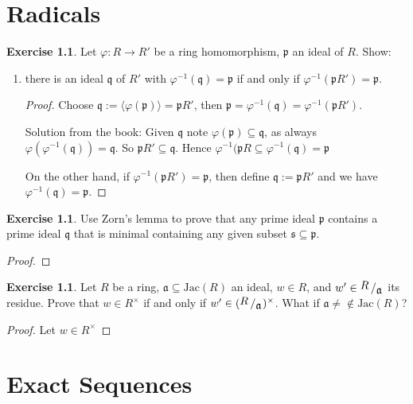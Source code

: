 \documentclass{book}
\theoremstyle{plain}
\theoremstyle{definition}
\newtheorem{exr}[thm]{Exercise}
\theoremstyle{custom_definition}
\newcommand{\bigslant}[2]{{\raisebox{.2em}{$#1$}\left/\raisebox{-.2em}{$#2$}\right.}}
\begin{document}
\chapter{Radicals}

\begin{exr}%
  Let \(\varphi: R \longrightarrow R'\) be a ring homomorphism, \(\mathfrak{p}\) an ideal of \(R\). Show:
  \begin{enumerate}
    \item there is an ideal \(\mathfrak{q}\) of \(R'\) with \(\varphi^{-1}(\mathfrak{q}) = \mathfrak{p}\) if and only if \(\varphi^{-1}(\mathfrak{p}R') = \mathfrak{p}\).
    \begin{proof}
      Choose \(\mathfrak{q} := \langle \varphi(\mathfrak{p}) \rangle = \mathfrak{p}R'\), then \(\mathfrak{p} = \varphi^{-1}(\mathfrak{q}) = \varphi^{-1}(\mathfrak{p}R')\).

      Solution from the book: Given \(\mathfrak{q}\) note \(\varphi(\mathfrak{p}) \subseteq \mathfrak{q}\), as always \(\varphi(\varphi^{-1} (\mathfrak{q})) = \mathfrak{q}\). So \(\mathfrak{p}R' \subseteq \mathfrak{q}\). Hence \(\varphi^{-1}(\mathfrak{p}R \subseteq \varphi^{-1}(\mathfrak{q}) = \mathfrak{p}\)

      On the other hand, if \(\varphi^{-1}(\mathfrak{p}R') = \mathfrak{p}\), then define \(\mathfrak{q} := \mathfrak{p}R'\) and we have \(\varphi^{-1}(\mathfrak{q}) = \mathfrak{p}\).
    \end{proof}
  \end{enumerate}
\end{exr}

\begin{exr}
  Use Zorn's lemma to prove that any prime ideal \(\mathfrak{p}\) contains a prime ideal \(\mathfrak{q}\) that is minimal containing any given subset \(\mathfrak{s} \subseteq \mathfrak{p}\).
\end{exr}

\begin{proof}
  
\end{proof}

\begin{exr}
  Let \(R\) be a ring, \(\mathfrak{a} \subseteq \text{Jac}(R)\) an ideal, \(w \in R\), and \(w' \in \bigslant{R}{\mathfrak{a}}\) its residue. Prove that \(w \in R^\times\) if and only if \(w' \in (\bigslant{R}{\mathfrak{a}})^\times\). What if \(\mathfrak{a} \neq \notin \text{Jac}(R)\)?
\end{exr}

\begin{proof}
  Let \(w \in R^\times\)
\end{proof}

\chapter{Exact Sequences}
\end{document}
